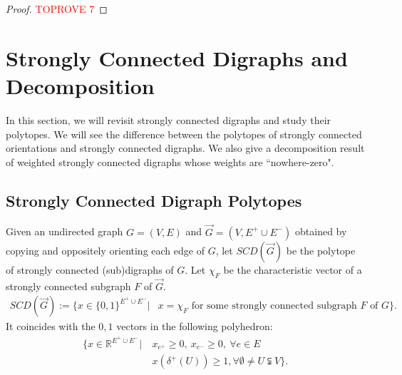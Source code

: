 \documentclass[runningheads]{llncs}
\begin{document}
\begin{proof}\textcolor{red}{TOPROVE 7}\end{proof}











\section{Strongly Connected Digraphs and Decomposition}\label{sec:Decompose_SCD}
In this section, we will revisit strongly connected digraphs and study their polytopes. We will see the difference between the polytopes of strongly connected orientations and strongly connected digraphs. We also give a decomposition result of weighted strongly connected digraphs whose weights are ``nowhere-zero". 
\subsection{Strongly Connected Digraph Polytopes}
Given an undirected graph $G=(V,E)$ and $\vec{G}=(V,E^+\cup E^-)$ obtained by copying and oppositely orienting each edge of $G$, let $SCD(\vec{G})$ be the polytope of strongly connected (sub)digraphs of $G$. Let $\chi_F$ be the characteristic vector of a strongly connected subgraph $F$ of $\vec{G}$.
     \begin{equation}
    \begin{aligned}
        SCD(\vec{G}):=\big\{x\in\{0,1\}^{E^+\cup E^-}\big|&x=\chi_F \text{ for some }  \text{strongly connected subgraph $F$ of $G$}\big\}.
    \end{aligned}
    \end{equation}
It coincides with the $0,1$ vectors in the following polyhedron:
\[
\begin{aligned}
    \big\{x\in\mathbb{R}^{E^+\cup E^-}\big|~&x_{e^+}\geq 0,~ x_{e^-}\geq 0, ~\forall e\in E\\
        &x(\delta^+(U))\geq 1, \forall \emptyset \neq U\subsetneqq V\big\}.
\end{aligned}
\]
\end{document}
